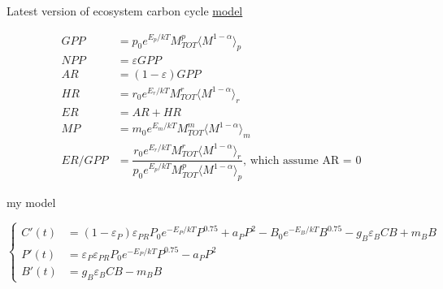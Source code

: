 \documentclass[a4paper,11pt]{article}
\begin{document}
Latest version of ecosystem carbon cycle \href{https://www.sciencedirect.com/science/article/pii/B9780123850058000071}{model}

\begin{align}
    GPP &= p_0e^{E_p/kT}M_{TOT}^p\langle M^{1-\alpha}\rangle_p\\
    NPP &= \varepsilon GPP\\
    AR &= (1-\varepsilon)GPP\\
    HR &= r_0e^{E_r/kT}M_{TOT}^r\langle M^{1-\alpha}\rangle_r\\
    ER &= AR + HR\\
    MP &= m_0e^{E_m/kT}M_{TOT}^m\langle M^{1-\alpha}\rangle_m\\
    ER/GPP &= \dfrac{r_0e^{E_r/kT}M_{TOT}^r\langle M^{1-\alpha}\rangle_r}{p_0e^{E_p/kT}M_{TOT}^p\langle M^{1-\alpha}\rangle_p}\text{, which assume AR = 0}
\end{align}

my model

\begin{equation}\left\{\begin{array}{rl}
C'(t) &= (1-\varepsilon_P)\varepsilon_{PR}P_0e^{-E_P/kT}P^{0.75} +a_PP^2 -B_0e^{-E_B/kT}B^{0.75} -g_B\varepsilon_{B}CB +m_BB\\
P'(t) &= \varepsilon_P\varepsilon_{PR}P_0e^{-E_P/kT}P^{0.75} -a_PP^2\\
B'(t) &= g_B\varepsilon_{B}CB -m_BB
\end{array}\right.\end{equation}
\end{document}
